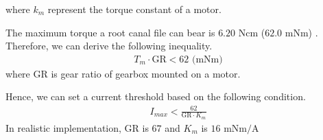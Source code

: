 where $k_m$ represent the torque constant of a motor.
\par\noindent
The maximum torque a root canal file can bear is $6.20$ Ncm ($62.0$ mNm) \cite{boessler2009effect}. Therefore, we can derive the following inequality.
\begin{equation}
\begin{split}
T_m \cdot \mathrm{GR} < 62 \text{ (mNm)}
\end{split}
\end{equation}
where $\mathrm{GR}$ is gear ratio of gearbox mounted on a motor.
\par
Hence, we can set a current threshold based on the following condition. 
\begin{equation}
\begin{split}
I_{max} < \frac{62}{\mathrm{GR} \cdot K_m}
\end{split}
\end{equation} 
In realistic implementation, $\mathrm{GR}$ is $67$ and $K_m$ is $16 \text{ mNm/A}$
